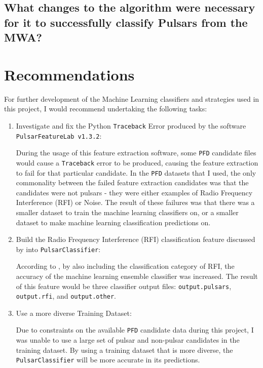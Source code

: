 \documentclass{article}
\begin{document}
\subsection{What changes to the algorithm were necessary for it to successfully classify Pulsars from the MWA?}

\pagebreak
\section{Recommendations}

For further development of the Machine Learning classifiers and strategies used in this project, I would recommend undertaking the following tasks:

\begin{enumerate}
    \item Investigate and fix the Python \verb|Traceback| Error produced by the software \verb|PulsarFeatureLab v1.3.2|:

    During the usage of this feature extraction software, some \verb|PFD| candidate files would cause a \verb|Traceback| error to be produced, causing the feature extraction to fail for that particular candidate. In the \verb|PFD| datasets that I used, the only commonality between the failed feature extraction candidates was that the candidates were not pulsars - they were either examples of Radio Frequency Interference (RFI) or Noise. The result of these failures was that there was a smaller dataset to train the machine learning classifiers on, or a smaller dataset to make machine learning classification predictions on.

    \item Build the Radio Frequency Interference (RFI) classification feature discussed by \textcite{tan} into \verb|PulsarClassifier|:
    
    According to \textcite{tan}, by also including the classification category of RFI, the accuracy of the machine learning ensemble classifier was increased. The result of this feature would be three classifier output files: \verb|output.pulsars|, \verb|output.rfi|, and \verb|output.other|.

    \item Use a more diverse Training Dataset:

    Due to constraints on the available \verb|PFD| candidate data during this project, I was unable to use a large set of pulsar and non-pulsar candidates in the training dataset. By using a training dataset that is more diverse, the \verb|PulsarClassifier| will be more accurate in its predictions.
\end{enumerate}
\end{document}
